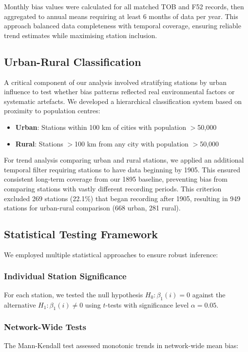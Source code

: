 \documentclass[11pt, a4paper]{article}
\begin{document}
Monthly bias values were calculated for all matched TOB and F52 records, then aggregated to annual means requiring at least 6 months of data per year. This approach balanced data completeness with temporal coverage, ensuring reliable trend estimates while maximising station inclusion.

\subsection{Urban-Rural Classification}

A critical component of our analysis involved stratifying stations by urban influence to test whether bias patterns reflected real environmental factors or systematic artefacts. We developed a hierarchical classification system based on proximity to population centres:

\begin{itemize}
    \item \textbf{Urban}: Stations within 100 km of cities with population $>$50,000
    \item \textbf{Rural}: Stations $>$100 km from any city with population $>$50,000
\end{itemize}

For trend analysis comparing urban and rural stations, we applied an additional temporal filter requiring stations to have data beginning by 1905. This ensured consistent long-term coverage from our 1895 baseline, preventing bias from comparing stations with vastly different recording periods. This criterion excluded 269 stations (22.1\%) that began recording after 1905, resulting in 949 stations for urban-rural comparison (668 urban, 281 rural).

\subsection{Statistical Testing Framework}

We employed multiple statistical approaches to ensure robust inference:

\subsubsection{Individual Station Significance}
For each station, we tested the null hypothesis $H_0: \beta_1(i) = 0$ against the alternative $H_1: \beta_1(i) \neq 0$ using $t$-tests with significance level $\alpha = 0.05$.

\subsubsection{Network-Wide Tests}
The Mann-Kendall test assessed monotonic trends in network-wide mean bias:
\end{document}

